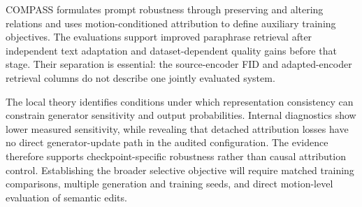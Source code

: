 COMPASS formulates prompt robustness through preserving and altering relations
and uses motion-conditioned attribution to define auxiliary training
objectives. The evaluations support improved paraphrase retrieval after
independent text adaptation and dataset-dependent quality gains before that
stage. Their separation is essential: the source-encoder FID and
adapted-encoder retrieval columns do not describe one jointly evaluated system.

The local theory identifies conditions under which representation consistency
can constrain generator sensitivity and output probabilities. Internal
diagnostics show lower measured sensitivity, while revealing that detached
attribution losses have no direct generator-update path in the audited
configuration. The evidence therefore supports checkpoint-specific robustness
rather than causal attribution control. Establishing the broader selective
objective will require matched training comparisons, multiple generation and
training seeds, and direct motion-level evaluation of semantic edits.